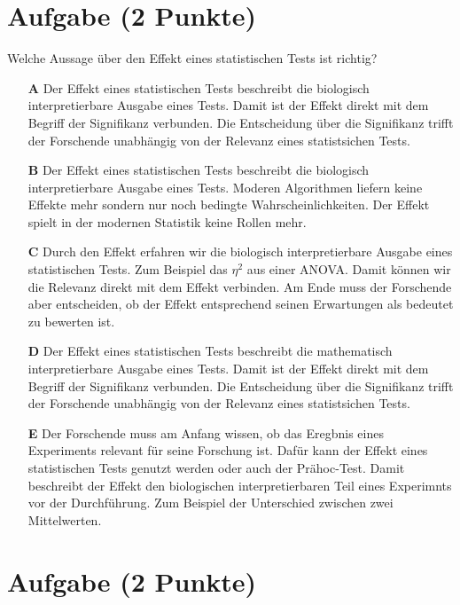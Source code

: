 \documentclass[a4paper, 9pt]{scrartcl}\usepackage[]{graphicx}\usepackage[]{xcolor}
\begin{document}
\section{Aufgabe \hfill (2 Punkte)}



Welche Aussage über den Effekt eines statistischen Tests ist richtig?



\begin{enumerate}
\item [\textbf{A} \msquare] Der Effekt eines statistischen Tests beschreibt die biologisch interpretierbare Ausgabe eines Tests. Damit ist der Effekt direkt mit dem Begriff der Signifikanz verbunden. Die Entscheidung über die Signifikanz trifft der Forschende unabhängig von der Relevanz eines statistsichen Tests.
\item [\textbf{B} \msquare] Der Effekt eines statistischen Tests beschreibt die biologisch interpretierbare Ausgabe eines Tests. Moderen Algorithmen liefern keine Effekte mehr sondern nur noch bedingte Wahrscheinlichkeiten. Der Effekt spielt in der modernen Statistik keine Rollen mehr.
\item [\textbf{C} \msquare] Durch den Effekt erfahren wir die biologisch interpretierbare Ausgabe eines statistischen Tests. Zum Beispiel das $\eta^2$ aus einer ANOVA. Damit können wir die Relevanz direkt mit dem Effekt verbinden. Am Ende muss der Forschende aber entscheiden, ob der Effekt entsprechend seinen Erwartungen als bedeutet zu bewerten ist.
\item [\textbf{D} \msquare] Der Effekt eines statistischen Tests beschreibt die mathematisch interpretierbare Ausgabe eines Tests. Damit ist der Effekt direkt mit dem Begriff der Signifikanz verbunden. Die Entscheidung über die Signifikanz trifft der Forschende unabhängig von der Relevanz eines statistsichen Tests.
\item [\textbf{E} \msquare] Der Forschende muss am Anfang wissen, ob das Eregbnis eines Experiments relevant für seine Forschung ist. Dafür kann der Effekt eines statistischen Tests genutzt werden oder auch der Prähoc-Test. Damit beschreibt der Effekt den biologischen interpretierbaren Teil eines Experimnts vor der Durchführung. Zum Beispiel der Unterschied zwischen zwei Mittelwerten.
\end{enumerate}

\section{Aufgabe \hfill (2 Punkte)}
\end{document}
